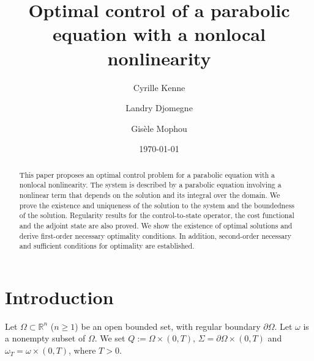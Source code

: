 \documentclass[reqno,twoside]{amsart}
\numberwithin{equation}{section}
\theoremstyle{definition}
\numberwithin{equation}{section}
\def \R {\mathbb{R}}
\def \R {\mathbb{R}}
\begin{document}
	\title[Optimal control of a parabolic equation with a nonlocal nonlinearity]{Optimal control of a parabolic equation with a nonlocal nonlinearity}
\author{Cyrille Kenne }
\address{Cyrille Kenne, Laboratoire L3MA, UFR STE et IUT, Universit\'e
	des Antilles, 97275 Schoelcher, Martinique}
\author{Landry Djomegne }
\address{Landry Djomegne, University of Dschang, BP 67 Dschang, Cameroon, West region}
\author{Gis\`{e}le Mophou}
\address{Gis\`ele Mophou, Laboratoire LAMIA, D\'epartement de Math\'ematiques et Informatique, Universit\'{e} des Antilles, Campus Fouillole, 97159 Pointe-\`a-Pitre,(FWI), Guadeloupe, Laboratoire  MAINEGE, Universit\'e Ouaga 3S, 06 BP 10347 Ouagadougou 06, Burkina Faso.}
	\date{\today}
	
		
	\begin{abstract}
		This paper proposes an optimal control problem for a parabolic equation with a nonlocal nonlinearity. The system is described by a parabolic equation involving a nonlinear term that depends on the solution and its integral over the domain. We prove the existence and uniqueness of the solution to the system and the boundedness of the solution.  Regularity results for the control-to-state operator, the cost functional and the adjoint state are also proved. We show the existence of optimal solutions and derive first-order necessary optimality conditions. In addition, second-order necessary and sufficient conditions for optimality are established.
	\end{abstract}
	\maketitle	
	
\section{Introduction}
Let $\Omega\subset \R^n$ ($n\geq 1$) be an open bounded set, with regular boundary $\partial \Omega$. Let  $\omega$ is a nonempty subset of $\Omega$. We set $Q:=\Omega\times (0,T)$, $\Sigma=\partial\Omega\times (0,T)$ and $\omega_T =\omega\times (0,T )$, where $T>0$.
\end{document}
